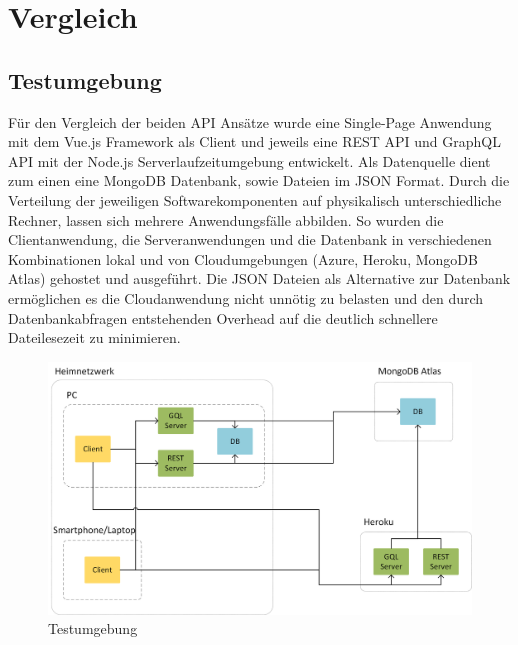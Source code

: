 \chapter{Vergleich}
\section{Testumgebung}
Für den Vergleich der beiden API Ansätze wurde eine Single-Page Anwendung mit dem Vue.js Framework als Client und jeweils eine REST API und GraphQL API mit der Node.js Serverlaufzeitumgebung entwickelt.
Als Datenquelle dient zum einen eine MongoDB Datenbank, sowie Dateien im JSON Format.
Durch die Verteilung der jeweiligen Softwarekomponenten auf physikalisch unterschiedliche Rechner, lassen sich mehrere Anwendungsfälle abbilden.
So wurden die Clientanwendung, die Serveranwendungen und die Datenbank in verschiedenen Kombinationen lokal und von Cloudumgebungen (Azure, Heroku, MongoDB Atlas) gehostet und ausgeführt.
Die JSON Dateien als Alternative zur Datenbank ermöglichen es die Cloudanwendung nicht unnötig zu belasten und den durch Datenbankabfragen entstehenden Overhead auf die deutlich schnellere Dateilesezeit zu minimieren.
\begin{figure}[h]
  \centering
  \includegraphics[width=\linewidth]{../Kapitel/Grafiken/netzwerk.png}
  \caption{Testumgebung}
  \label{img:REST-diss}
\end{figure}
